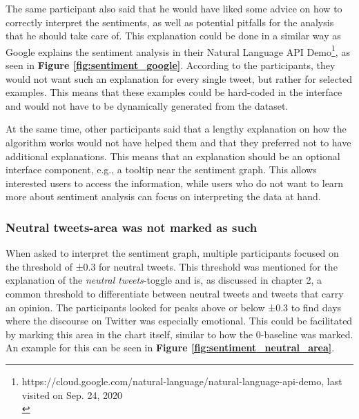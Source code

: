 The same participant also said that he would have liked some advice on how to correctly interpret the sentiments, as well as potential pitfalls for the analysis that he should take care of. This explanation could be done in a similar way as Google explains the sentiment analysis in their Natural Language API Demo\footnote{https://cloud.google.com/natural-language/natural-language-api-demo, last visited on Sep. 24, 2020\\}, as seen in \textbf{Figure \ref{fig:sentiment_google}}. According to the participants, they would not want such an explanation for every single tweet, but rather for selected examples. This means that these examples could be hard-coded in the interface and would not have to be dynamically generated from the dataset.

At the same time, other participants said that a lengthy explanation on how the algorithm works would not have helped them and that they preferred not to have additional explanations. This means that an explanation should be an optional interface component, e.g., a tooltip near the sentiment graph. This allows interested users to access the information, while users who do not want to learn more about sentiment analysis can focus on interpreting the data at hand.

\subsubsection*{Neutral tweets-area was not marked as such}
When asked to interpret the sentiment graph, multiple participants focused on the threshold of ±0.3 for neutral tweets. This threshold was mentioned for the explanation of the \emph{neutral tweets}-toggle and is, as discussed in chapter 2, a common threshold to differentiate between neutral tweets and tweets that carry an opinion. The participants looked for peaks above or below ±0.3 to find days where the discourse on Twitter was especially emotional. This could be facilitated by marking this area in the chart itself, similar to how the 0-baseline was marked. An example for this can be seen in \textbf{Figure \ref{fig:sentiment_neutral_area}}.

